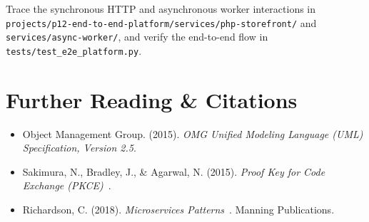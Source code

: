 \begin{labbridgebox}
Trace the synchronous HTTP and asynchronous worker interactions in \texttt{projects/p12-end-to-end-platform/services/php-storefront/} and \texttt{services/async-worker/}, and verify the end-to-end flow in \texttt{tests/test\_e2e\_platform.py}.
\end{labbridgebox}

\section{Further Reading \protect\& Citations}
\begin{itemize}[leftmargin=18pt]
  \item Object Management Group. (2015). \textit{OMG Unified Modeling Language (UML) Specification, Version 2.5}.
  \item Sakimura, N., Bradley, J., \& Agarwal, N. (2015). \textit{Proof Key for Code Exchange (PKCE)}~\cite{rfc7636}.
  \item Richardson, C. (2018). \textit{Microservices Patterns}~\cite{richardson2018microservices}. Manning Publications.
\end{itemize}
